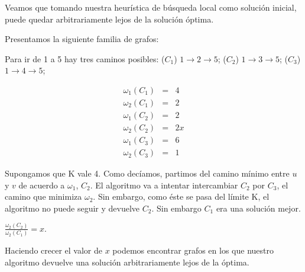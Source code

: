 Veamos que tomando nuestra heurística de búsqueda local como solución inicial, puede quedar arbitrariamente lejos de la solución óptima.

Presentamos la siguiente familia de grafos:


Para ir de 1 a 5 hay tres caminos posibles: ($C_1$) $1 \rightarrow 2 \rightarrow 5$; ($C_2$) $1 \rightarrow 3 \rightarrow 5$;
($C_3$) $1 \rightarrow 4 \rightarrow 5$;

\begin{eqnarray}
 \omega_1(C_1) &=& 4	\\ 
 \omega_2(C_1) &=& 2	\\
 \omega_1(C_2) &=& 2	\\
 \omega_2(C_2) &=& 2x   \\
 \omega_1(C_3) &=& 6	\\
 \omega_2(C_3) &=& 1
\end{eqnarray}

Supongamos que K vale 4.
Como decíamos, partimos del camino mínimo entre $u$ y $v$ de acuerdo a $\omega_1$, $C_2$. El algoritmo va a intentar intercambiar $C_2$ por
$C_3$, el camino que minimiza $\omega_2$. Sin embargo, como éste se pasa del límite K, el algoritmo no puede seguir y devuelve $C_2$. Sin
embargo $C_1$ era una solución mejor.

$\frac{\omega_2(C_2)}{\omega_2(C_1)} = x$.

Haciendo crecer el valor de $x$ podemos encontrar grafos en los que nuestro algoritmo devuelve una
solución arbitrariamente lejos de la óptima.

